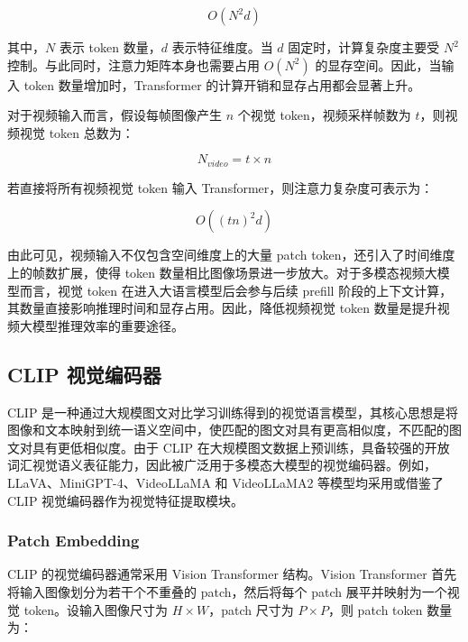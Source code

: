 \begin{equation}
    \label{equ:attention_complexity}
    O(N^2d)
\end{equation}

其中，$N$ 表示 token 数量，$d$ 表示特征维度。当 $d$ 固定时，计算复杂度主要受 $N^2$ 控制。与此同时，注意力矩阵本身也需要占用 $O(N^2)$ 的显存空间。因此，当输入 token 数量增加时，Transformer 的计算开销和显存占用都会显著上升。

对于视频输入而言，假设每帧图像产生 $n$ 个视觉 token，视频采样帧数为 $t$，则视频视觉 token 总数为：

\begin{equation}
    \label{equ:video_token_number}
    N_{video}=t\times n
\end{equation}

若直接将所有视频视觉 token 输入 Transformer，则注意力复杂度可表示为：

\begin{equation}
    \label{equ:video_attention_complexity}
    O((t n)^2 d)
\end{equation}

由此可见，视频输入不仅包含空间维度上的大量 patch token，还引入了时间维度上的帧数扩展，使得 token 数量相比图像场景进一步放大。对于多模态视频大模型而言，视觉 token 在进入大语言模型后会参与后续 prefill 阶段的上下文计算，其数量直接影响推理时间和显存占用。因此，降低视频视觉 token 数量是提升视频大模型推理效率的重要途径。

\subsection{CLIP 视觉编码器}

CLIP 是一种通过大规模图文对比学习训练得到的视觉语言模型，其核心思想是将图像和文本映射到统一语义空间中，使匹配的图文对具有更高相似度，不匹配的图文对具有更低相似度\cite{clip2021}。由于 CLIP 在大规模图文数据上预训练，具备较强的开放词汇视觉语义表征能力，因此被广泛用于多模态大模型的视觉编码器。例如，LLaVA、MiniGPT-4、VideoLLaMA 和 VideoLLaMA2 等模型均采用或借鉴了 CLIP 视觉编码器作为视觉特征提取模块\cite{llava2023,minigpt42023,videollama2023,videollama22024}。

\subsubsection{Patch Embedding}

CLIP 的视觉编码器通常采用 Vision Transformer 结构。Vision Transformer 首先将输入图像划分为若干个不重叠的 patch，然后将每个 patch 展平并映射为一个视觉 token\cite{vit2021}。设输入图像尺寸为 $H\times W$，patch 尺寸为 $P\times P$，则 patch token 数量为：

